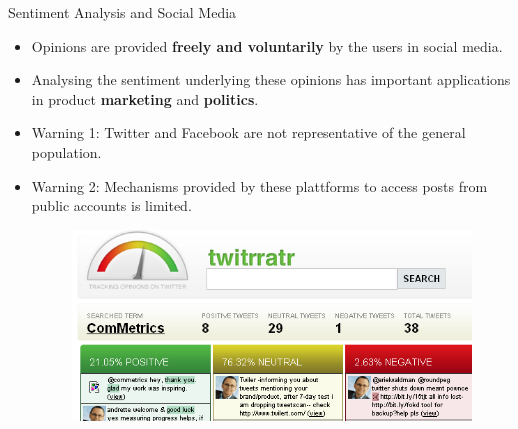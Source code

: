 \documentclass[handout]{beamer}
\begin{document}
\begin{frame}{Sentiment Analysis and Social Media}
\begin{scriptsize}
\begin{itemize}
 \item Opinions are provided \textbf{freely and voluntarily} by the users in social media. 
 \item Analysing the sentiment underlying these opinions has important applications in product \textbf{marketing} and \textbf{politics}.
 
  \item Warning 1: Twitter and Facebook are not representative of the general population.
  
  \item Warning 2: Mechanisms provided by these plattforms to access posts from public accounts is limited.
 
   \begin{figure}[h]
        	\includegraphics[scale = 0.5]{pics/tweetOpinions.png}
        \end{figure}
\end{itemize}
\end{scriptsize}




\end{frame}
\end{document}
